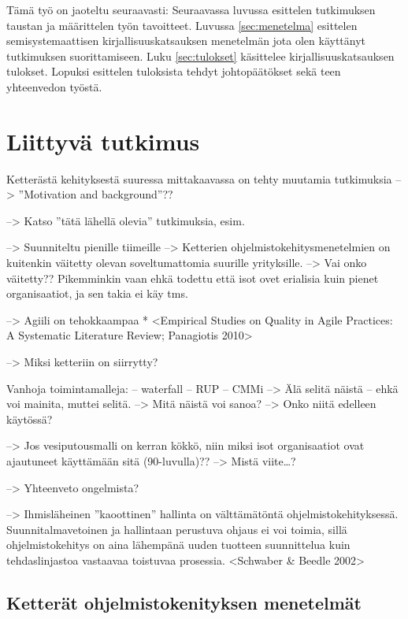 Tämä työ on jaoteltu seuraavasti:
Seuraavassa luvussa esittelen tutkimuksen taustan ja määrittelen työn
tavoitteet. Luvussa \ref{sec:menetelma} esittelen semisystemaattisen
kirjallisuuskatsauksen menetelmän jota olen käyttänyt tutkimuksen
suorittamiseen. Luku \ref{sec:tulokset} käsittelee kirjallisuuskatsauksen
tulokset. Lopuksi esittelen tuloksista tehdyt johtopäätökset sekä teen
yhteenvedon työstä.



\section{Liittyvä tutkimus}
\label{sec:tausta}

Ketterästä kehityksestä suuressa mittakaavassa on tehty muutamia tutkimuksia
--> ''Motivation and background''??

--> Katso ''tätä lähellä olevia'' tutkimuksia, esim. 

--> Suunniteltu pienille tiimeille --> Ketterien ohjelmistokehitysmenetelmien on
kuitenkin väitetty olevan soveltumattomia suurille yrityksille. --> Vai onko
väitetty?? Pikemminkin vaan ehkä todettu että isot ovet erialisia kuin pienet
organisaatiot, ja sen takia ei käy tms.

--> Agiili on tehokkaampaa
  * <Empirical Studies on Quality in Agile Practices: A Systematic Literature Review; Panagiotis 2010>

--> Miksi ketteriin on siirrytty?

Vanhoja toimintamalleja:
-- waterfall
-- RUP
-- CMMi
--> Älä selitä näistä -- ehkä voi mainita, muttei selitä.
--> Mitä näistä voi sanoa? --> Onko niitä edelleen käytössä?

--> Jos vesiputousmalli on kerran kökkö, niin miksi isot organisaatiot ovat
ajautuneet käyttämään sitä (90-luvulla)?? --> Mistä viite\ldots?

--> Yhteenveto ongelmista?

--> Ihmisläheinen ''kaoottinen'' hallinta on välttämätöntä ohjelmistokehityksessä.
Suunnitalmavetoinen ja hallintaan perustuva ohjaus ei voi toimia, sillä
ohjelmistokehitys on aina lähempänä uuden tuotteen suunnittelua kuin
tehdaslinjastoa vastaavaa toistuvaa prosessia. <Schwaber \& Beedle 2002>


\subsection{Ketterät ohjelmistokenityksen menetelmät}

